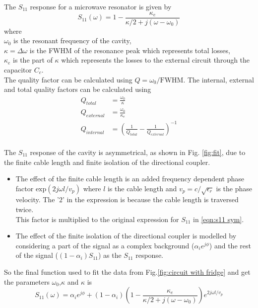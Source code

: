 The $S_{11}$ response for a microwave resonator is given by \cite{Aspelmeyer2014}
\begin{equation}
S_{11}(\omega) = 1-\frac{\kappa_e}{\kappa/2+j(\omega-\omega_0)}
\label{eqn:s11 sym}
\end{equation}
where\\
$\omega_0$ is the resonant frequency of the cavity,\\
$\kappa = \Delta\omega$ is the FWHM of the resonance peak which represents total losses,\\
$\kappa_e$ is the part of $\kappa$ which represents the losses to the external circuit through the capacitor $C_c$.\\
The quality factor can be calculated using $Q = \omega_0/\text{FWHM}$. The internal, external and total quality factors can be calculated using
\begin{align}
Q_{total} &= \frac{\omega_0}{\kappa}\\
Q_{external} &= \frac{\omega_0}{\kappa_e}\\
Q_{internal} &= \left(\frac{1}{Q_{total}}-\frac{1}{Q_{external}}\right)^{-1}\\
\end{align}

The $S_{11}$ response of the cavity is asymmetrical, as shown in Fig. \ref{fig:fit}, due to the finite cable length and finite isolation of the directional coupler.
\begin{itemize}
\item The effect of the finite cable length is an added frequency dependent phase factor $\text{exp}(2j\omega l/v_p)$ where $l$ is the cable length and $v_p=c/\sqrt{\epsilon_r}$ is the phase velocity. The '$2$' in the expression is because the cable length is traversed twice.\\
This factor is multiplied to the original expression for $S_{11}$ in \ref{eqn:s11 sym}.
\item The effect of the finite isolation of the directional coupler is modelled by considering a part of the signal as a complex background ($\alpha_i e^{j\phi}$) and the rest of the signal ($(1-\alpha_i)S_{11}$) as the $S_{11}$ response.
\end{itemize}
So the final function used to fit the data from Fig.\ref{fig:circuit with fridge} and get the parameters $\omega_0$,$\kappa$ and $\kappa$ is
\begin{equation}
S_{11}(\omega) = \alpha_i e^{j\phi}+(1-\alpha_i)\left(1-\frac{\kappa_e}{\kappa/2+j(\omega-\omega_0)}\right)e^{2j\omega l/v_p}
\end{equation}

